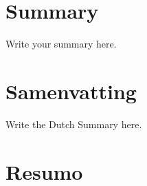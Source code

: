 \chapter*{Summary}

Write your summary here.

\chapter*{Samenvatting}

{
	
	Write the Dutch Summary here.
}


\chapter*{Resumo}

{
	
	
}

